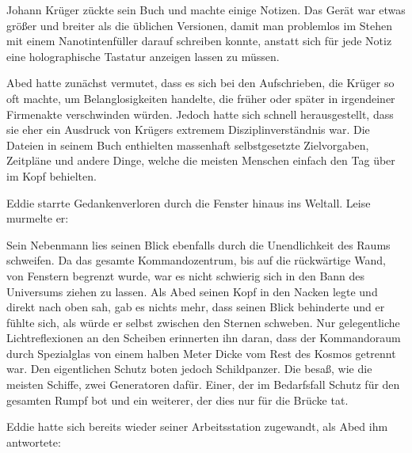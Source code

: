 \par

Johann Krüger zückte sein Buch und machte einige Notizen. Das Gerät war etwas größer und breiter als die üblichen Versionen, damit man problemlos im Stehen mit einem Nanotintenfüller darauf schreiben konnte, anstatt sich für jede Notiz eine holographische Tastatur anzeigen lassen zu müssen.

\par

Abed hatte zunächst vermutet, dass es sich bei den Aufschrieben, die Krüger so oft machte, um Belanglosigkeiten handelte, die früher oder später in irgendeiner Firmenakte verschwinden würden. Jedoch hatte sich schnell herausgestellt, dass sie eher ein Ausdruck von Krügers extremem Disziplinverständnis war. Die Dateien in seinem Buch enthielten massenhaft selbstgesetzte Zielvorgaben, Zeitpläne und andere Dinge, welche die meisten Menschen einfach den Tag über im Kopf behielten.

\par

Eddie starrte Gedankenverloren durch die Fenster hinaus ins Weltall. Leise murmelte er: 

\par

Sein Nebenmann lies seinen Blick ebenfalls durch die Unendlichkeit des Raums schweifen. Da das gesamte Kommandozentrum, bis auf die rückwärtige Wand, von Fenstern begrenzt wurde, war es nicht schwierig sich in den Bann des Universums ziehen zu lassen. Als Abed seinen Kopf in den Nacken legte und direkt nach oben sah, gab es nichts mehr, dass seinen Blick behinderte und er fühlte sich, als würde er selbst zwischen den Sternen schweben. Nur gelegentliche Lichtreflexionen an den Scheiben erinnerten ihn daran, dass der Kommandoraum durch Spezialglas von einem halben Meter Dicke vom Rest des Kosmos getrennt war. Den eigentlichen Schutz boten jedoch Schildpanzer. Die  besaß, wie die meisten Schiffe, zwei Generatoren dafür. Einer, der im Bedarfsfall Schutz für den gesamten Rumpf bot und ein weiterer, der dies nur für die Brücke tat.

\par

Eddie hatte sich bereits wieder seiner Arbeitsstation zugewandt, als Abed ihm antwortete: 

